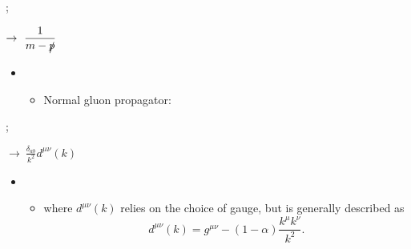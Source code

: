 \begin{center}
\begin{minipage}{0.4\textwidth}
    \begin{flushright}
        ;
    \end{flushright}
\end{minipage}\hspace*{1em}
\begin{minipage}{0.4\textwidth}
    \begin{flushleft}
        $\displaystyle\rightarrow\ \frac{1}{m-\slashed{p}}$
    \end{flushleft}
\end{minipage}
\end{center}





\begin{itemize}
    \item[]
    \begin{itemize}
        \item Normal gluon propagator:
    \end{itemize}
\end{itemize}

\begin{center}
\begin{minipage}{0.4\textwidth}
    \begin{flushright}
        ;
    \end{flushright}
\end{minipage}\hspace*{1em}
\begin{minipage}{0.4\textwidth}
    \begin{flushleft}
        $\displaystyle\rightarrow\ \frac{\delta_{ab}}{k^2} d^{\mu\nu}(k)$
    \end{flushleft}
\end{minipage}
\end{center}
\begin{itemize}
    \item[] \begin{itemize}
        \item[] where $d^{\mu\nu}(k)$ relies on the choice of gauge, but is generally described as
            \begin{equation}
                d^{\mu\nu}(k) = g^{\mu\nu} - (1-\alpha) \frac{k^{\mu}k^{\nu}}{k^2}.
            \end{equation}
    \end{itemize}
\end{itemize}






